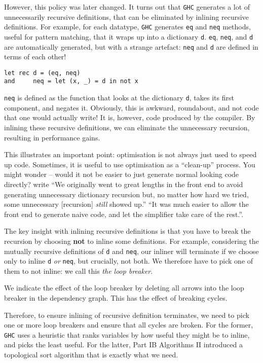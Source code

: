However, this policy was later changed. It turns out that \texttt{GHC} generates a lot of unnecessarily recursive definitions, that can be eliminated by inlining recursive definitions. For example, for each datatype, \texttt{GHC} generates \texttt{eq} and \texttt{neq} methods, useful for pattern matching, that it wraps up into a dictionary \texttt{d}. \texttt{eq}, \texttt{neq}, and \texttt{d} are automatically generated, but with a strange artefact: \texttt{neq} and \texttt{d} are defined in terms of each other!
\begin{verbatim}
let rec d = (eq, neq)
and     neq = let (x, _) = d in not x
\end{verbatim}
\texttt{neq} is defined as the function that looks at the dictionary \texttt{d}, takes its first component, and negates it. Obviously, this is awkward, roundabout, and not code that one would actually write! It is, however, code produced by the compiler. By inlining these recursive definitions, we can eliminate the unnecessary recursion, resulting in performance gains.

This illustrates an important point: optimisation is not always just used to speed up code. Sometimes, it is useful to use optimisation as a ``clean-up'' process. You might wonder -- would it not be easier to just generate normal looking code directly? \citet{peyton-jones-2002} write ``We originally went to great lengths in the front end to avoid generating unnecessary dictionary recursion but, no matter how hard we tried, some unnecessary [recursion] \textit{still} showed up.'' ``It was much easier to allow the front end to generate naive code, and let the simplifier take care of the rest.''. 

The key insight with inlining recursive definitions is that you have to break the recursion by choosing \textbf{not} to inline some definitions. For example, considering the mutually recursive definitions of \texttt{d} and \texttt{neq}, our inliner will terminate if we choose only to inline \texttt{d} \textit{or} \texttt{neq}, but crucially, not both. We therefore have to pick one of them to not inline: we call this \textit{the loop breaker}. 

We indicate the effect of the loop breaker by deleting all arrows into the loop breaker in the dependency graph. This has the effect of breaking cycles.

Therefore, to ensure inlining of recursive definition terminates, we need to pick one or more loop breakers and ensure that all cycles are broken. For the former, \texttt{GHC} uses a heuristic that ranks variables by how useful they might be to inline, and picks the least useful. For the latter, \textsf{Part IB Algorithms II} introduced a topological sort algorithm that is exactly what we need. 

